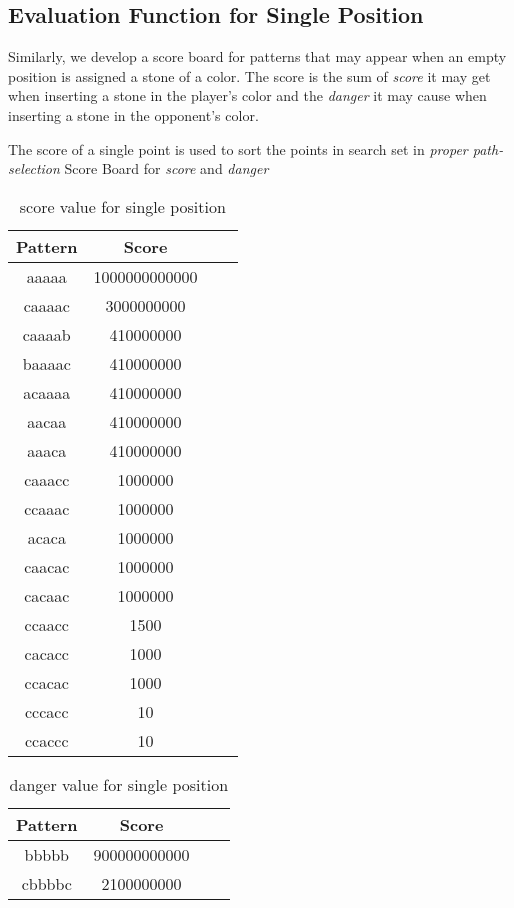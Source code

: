 \documentclass[conference]{IEEEtran}
\begin{document}
\subsection{Evaluation Function for Single Position}
Similarly, we develop a score board for patterns that may appear when an empty position is assigned a stone of a color. The score is the sum of \emph{score} it may get when inserting a stone in the player's color and the \emph{danger} it may cause when inserting a stone in the opponent's color.

The score of a single point is used to sort the points in search set in \emph{proper path-selection}
	Score Board for \emph{score} and \emph{danger}
	
	\begin{table}[H]
	\caption{score value for single position}
	\centering
    \begin{tabular}{cccc}
    \toprule
    Pattern&Score\\
    \midrule
	aaaaa&1000000000000\\
	caaaac&3000000000\\
	caaaab&410000000\\
    baaaac&410000000\\
    acaaaa&410000000\\
    aacaa&410000000\\
    aaaca&410000000\\
    caaacc&1000000\\
    ccaaac&1000000\\
    acaca&1000000\\
    caacac&1000000\\
    cacaac&1000000\\
    ccaacc&1500\\
    cacacc&1000\\
    ccacac&1000\\
    cccacc&10\\
    ccaccc&10\\    
	\bottomrule
	\end{tabular}
	\label{table:1}
	\end{table}
	

	\begin{table}[H]
	\caption{danger value for single position}
	\centering
    \begin{tabular}{cccc}
    \toprule
    Pattern&Score\\
    \midrule
	bbbbb&900000000000\\
	cbbbbc&2100000000\\
	\bottomrule
	\end{tabular}
	\label{table:1}
	\end{table}
	 
\end{document}
